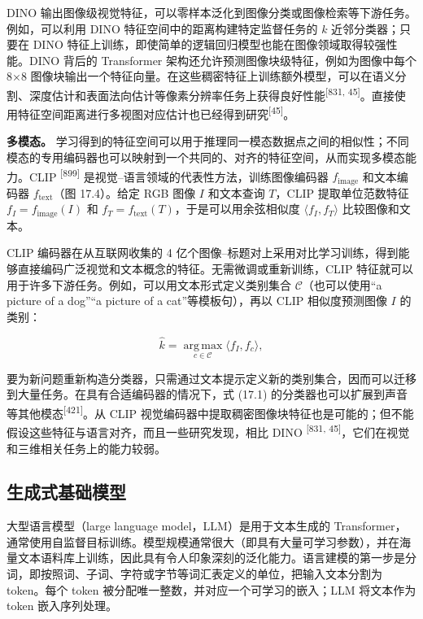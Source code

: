 DINO 输出图像级视觉特征，可以零样本泛化到图像分类或图像检索等下游任务。例如，可以利用 DINO 特征空间中的距离构建特定监督任务的 $k$ 近邻分类器；只要在 DINO 特征上训练，即使简单的逻辑回归模型也能在图像领域取得较强性能。DINO 背后的 Transformer 架构还允许预测图像块级特征，例如为图像中每个 8×8 图像块输出一个特征向量。在这些稠密特征上训练额外模型，可以在语义分割、深度估计和表面法向估计等像素分辨率任务上获得良好性能\textsuperscript{[831, 45]}。直接使用特征空间距离进行多视图对应估计也已经得到研究\textsuperscript{[45]}。

\textbf{多模态。} 学习得到的特征空间可以用于推理同一模态数据点之间的相似性；不同模态的专用编码器也可以映射到一个共同的、对齐的特征空间，从而实现多模态能力。CLIP \textsuperscript{[899]} 是视觉--语言领域的代表性方法，训练图像编码器 $f_{\mathrm{image}}$ 和文本编码器 $f_{\mathrm{text}}$（图 17.4）。给定 RGB 图像 $I$ 和文本查询 $T$，CLIP 提取单位范数特征 $f_I=f_{\mathrm{image}}(I)$ 和 $f_T=f_{\mathrm{text}}(T)$，于是可以用余弦相似度 $\langle f_I,f_T\rangle$ 比较图像和文本。

CLIP 编码器在从互联网收集的 4 亿个图像--标题对上采用对比学习训练，得到能够直接编码广泛视觉和文本概念的特征。无需微调或重新训练，CLIP 特征就可以用于许多下游任务。例如，可以用文本形式定义类别集合 $\mathcal{C}$（也可以使用“a picture of a dog”“a picture of a cat”等模板句），再以 CLIP 相似度预测图像 $I$ 的类别：

\begin{equation}
\hat{k}=\operatorname*{arg\,max}_{c\in\mathcal{C}}\langle f_I,f_c\rangle,\tag{17.1}
\end{equation}

要为新问题重新构造分类器，只需通过文本提示定义新的类别集合，因而可以迁移到大量任务。在具有合适编码器的情况下，式 (17.1) 的分类器也可以扩展到声音等其他模态\textsuperscript{[421]}。从 CLIP 视觉编码器中提取稠密图像块特征也是可能的；但不能假设这些特征与语言对齐，而且一些研究发现，相比 DINO \textsuperscript{[831, 45]}，它们在视觉和三维相关任务上的能力较弱。

\subsection{生成式基础模型}

大型语言模型（large language model，LLM）是用于文本生成的 Transformer，通常使用自监督目标训练。模型规模通常很大（即具有大量可学习参数），并在海量文本语料库上训练，因此具有令人印象深刻的泛化能力。语言建模的第一步是分词，即按照词、子词、字符或字节等词汇表定义的单位，把输入文本分割为 token。每个 token 被分配唯一整数，并对应一个可学习的嵌入；LLM 将文本作为 token 嵌入序列处理。

